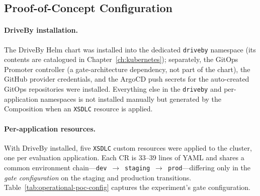 \subsection{Proof-of-Concept Configuration}
\label{subsec:operational-poc-config}

\paragraph{DriveBy installation.} The DriveBy Helm chart was installed into the dedicated \texttt{driveby} namespace (its contents are catalogued in Chapter~\ref{ch:kubernetes}); separately, the GitOps Promoter controller (a gate-architecture dependency, not part of the chart), the GitHub provider credentials, and the ArgoCD push secrets for the auto-created GitOps repositories were installed. Everything else in the \texttt{driveby} and per-application namespaces is not installed manually but generated by the Composition when an \texttt{XSDLC} resource is applied.

\paragraph{Per-application resources.} With DriveBy installed, five \texttt{XSDLC} custom resources were applied to the cluster, one per evaluation application. Each CR is 33--39 lines of YAML and shares a common environment chain---\texttt{dev}~$\rightarrow$~\texttt{staging}~$\rightarrow$~\texttt{prod}---differing only in the \emph{gate configuration} on the staging and production transitions. Table~\ref{tab:operational-poc-config} captures the experiment's gate configuration.

